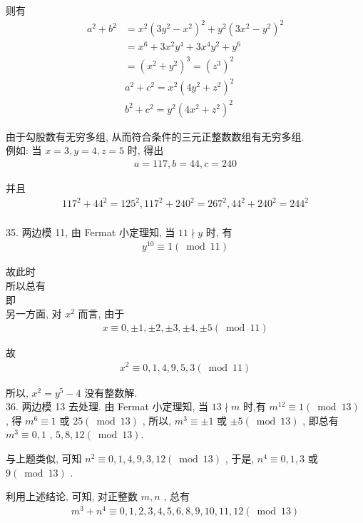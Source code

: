 则有\begin{align}
	a^{2}+b^{2} & =x^{2}\left(3 y^{2}-x^{2}\right)^{2}+y^{2}\left(3 x^{2}-y^{2}\right)^{2} \\
	            & =x^{6}+3 x^{2} y^{4}+3 x^{4} y^{2}+y^{6}                                 \\
	            & =\left(x^{2}+y^{2}\right)^{3}=\left(z^{3}\right)^{2}                     \\
	            & a^{2}+c^{2}=x^{2}\left(4 y^{2}+z^{2}\right)^{2}                          \\
	            & b^{2}+c^{2}=y^{2}\left(4 x^{2}+z^{2}\right)^{2}
\end{align}

由于勾股数有无穷多组, 从而符合条件的三元正整数数组有无穷多组.\\
例如: 当 $x=3, y=4, z=5$ 时, 得出
\begin{align*}
	a=117, b=44, c=240
\end{align*}

并且
\begin{align*}
	117^{2}+44^{2}=125^{2}, 117^{2}+240^{2}=267^{2}, 44^{2}+240^{2}=244^{2}
\end{align*}\\
35. 两边模 11, 由 Fermat 小定理知, 当 $11 \nmid y$ 时, 有
\begin{align*}
	y^{10} \equiv 1(\bmod 11)
\end{align*}

故此时\\
所以总有\\
即\\
另一方面, 对 $x^{2}$ 而言, 由于
\begin{align*}
	x \equiv 0, \pm 1, \pm 2, \pm 3, \pm 4, \pm 5(\bmod 11)
\end{align*}

故
\begin{align*}
	x^{2} \equiv 0,1,4,9,5,3(\bmod 11)
\end{align*}

所以,  $x^{2}=y^{5}-4$ 没有整数解. \\
36. 两边模 13 去处理. 由 Fermat 小定理知, 当 $13 \nmid m$ 时,有 $m^{12} \equiv 1(\bmod 13)$ , 得 $m^{6} \equiv 1$ 或 $25(\bmod 13)$ , 所以,  $m^{3} \equiv \pm 1$ 或 $\pm 5(\bmod 13)$ , 即总有 $m^{3} \equiv 0,1$ ,  $5,8,12(\bmod 13)$.

与上题类似, 可知 $n^{2} \equiv 0,1,4,9,3,12(\bmod 13)$ , 于是,  $n^{4} \equiv 0,1,3$ 或 $9(\bmod 13)$ .

利用上述结论, 可知, 对正整数 $m ,  n$ , 总有
\begin{align*}
	m^{3}+n^{4} \equiv 0,1,2,3,4,5,6,8,9,10,11,12(\bmod 13)
\end{align*}

